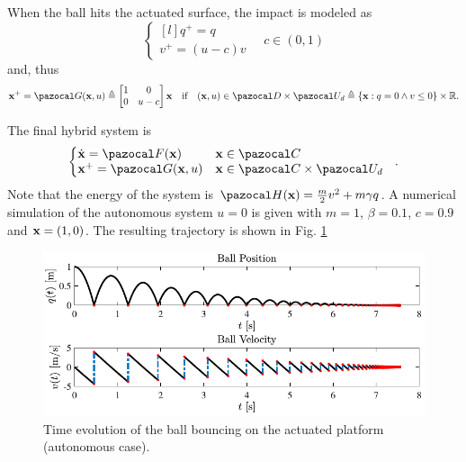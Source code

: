 \begin{exmp}
    When the ball hits the actuated surface, the impact is modeled as
    \begin{equation}
        \left\{
            \begin{matrix*}[l]
                q^+ = q\\
                v^+ = (u-c)v
            \end{matrix*}
        \right.
        \quad c\in(0,1)
    \end{equation}
    and, thus
    \begin{equation}
        \xb^+ = \G(\xb,u)\triangleq
        \begin{bmatrix}
            1&0\\
            0&u-c
        \end{bmatrix}\xb
        \quad \text{if}\quad (\xb,u)\in\D\times\U_d\triangleq\left\{\xb:q=0\land v\leq 0\right\}\times\R.
    \end{equation}
    
    The final hybrid system is 
    \begin{equation}
            \left\{
            \begin{matrix*}[l]
                \dot{\xb} = \F(\xb) &\xb\in\C\\
                \xb^+ = \G(\xb,u) &\xb\in\C\times\U_d
            \end{matrix*}
        \right.~~.
    \end{equation}
    Note that the energy of the system is $\Ha(\xb) = \frac{m}{2}v^2 + m\gamma q$.
    A numerical simulation of the autonomous system $u=0$ is given with $m=1$, $\beta = 0.1$, $c=0.9$ and $\mathbf{x}=(1,0)$. The resulting trajectory is shown in Fig. \ref{fig:bb1}
    \begin{figure}
        \centering
        \includegraphics[width=\linewidth]{Figures/bb1.pdf}
        \caption[Time evolution of the ball bouncing on the actuated platform (autonomous case)]{Time evolution of the ball bouncing on the actuated platform (autonomous case).}
        \label{fig:bb1}
    \end{figure}
\end{exmp}
%
%
